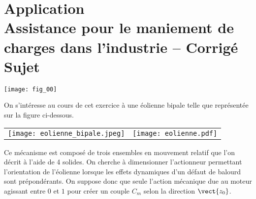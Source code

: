 \chapter*{Application  \\ 
Assistance pour le maniement de charges dans l’industrie -- \ifprof Corrigé \else Sujet \fi}

\iflivret {} \else
\ifprof  {} \else \fi
\fi

\setcounter{question}{0}
\begin{marginfigure}
\texttt{[image: fig\_00]}
\end{marginfigure}



\ifprof
\else
On s'intéresse au cours de cet exercice à une éolienne bipale telle que représentée sur la figure ci-dessous. 
\begin{center}
\begin{tabular}{cc}
\texttt{[image: eolienne\_bipale.jpeg]}
&
\texttt{[image: eolienne.pdf]}
\end{tabular}
\end{center}

Ce mécanisme est composé de trois ensembles en mouvement relatif que l'on décrit à l'aide de 4 solides.%
On cherche à dimensionner l'actionneur permettant l'orientation de l'éolienne lorsque les effets dynamiques d'un défaut de balourd sont prépondérants. 
%
On suppose donc que seule l'action mécanique due au moteur agissant entre $0$ et $1$ pour créer un couple $C_m$ selon la direction $\vect{z_0}$. 

